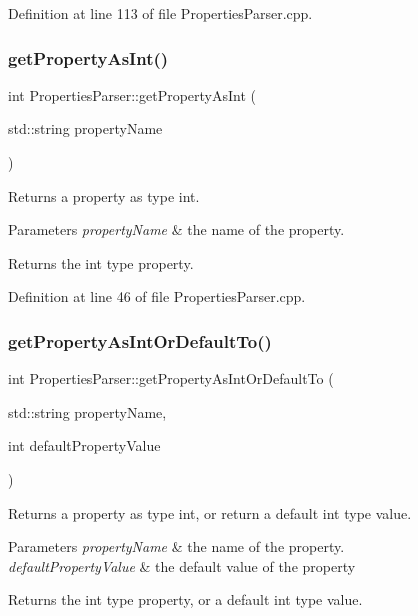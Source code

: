 Definition at line 113 of file Properties\+Parser.\+cpp.

\mbox{\label{class_properties_parser_abe15fe0fd4563627204f58f9256aacbf}} 
\subsubsection{get\+Property\+As\+Int()}
{\footnotesize\ttfamily int Properties\+Parser\+::get\+Property\+As\+Int (\begin{DoxyParamCaption}\item[{std\+::string}]{property\+Name }\end{DoxyParamCaption})}

Returns a property as type int. 
\begin{DoxyParams}{Parameters}
{\em property\+Name} & the name of the property. \\
\hline
\end{DoxyParams}
\begin{DoxyReturn}{Returns}
the int type property. 
\end{DoxyReturn}


Definition at line 46 of file Properties\+Parser.\+cpp.

\mbox{\label{class_properties_parser_a1ed9676009e9e2c0624150b8d3b658c0}} 
\subsubsection{get\+Property\+As\+Int\+Or\+Default\+To()}
{\footnotesize\ttfamily int Properties\+Parser\+::get\+Property\+As\+Int\+Or\+Default\+To (\begin{DoxyParamCaption}\item[{std\+::string}]{property\+Name,  }\item[{int}]{default\+Property\+Value }\end{DoxyParamCaption})}

Returns a property as type int, or return a default int type value. 
\begin{DoxyParams}{Parameters}
{\em property\+Name} & the name of the property. \\
\hline
{\em default\+Property\+Value} & the default value of the property \\
\hline
\end{DoxyParams}
\begin{DoxyReturn}{Returns}
the int type property, or a default int type value. 
\end{DoxyReturn}


